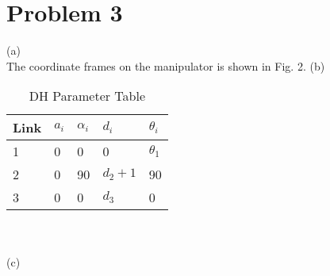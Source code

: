 \documentclass[twoside,11pt]{homework}
\begin{document}
\section*{Problem 3}
(a)\\
The coordinate frames on the manipulator is shown in Fig. 2.
(b)\\
%
\begin{table}[h!] \centering
\caption{DH Parameter Table}
\begin{tabular}{|l|l|l|l|l|}
\hline
Link & $a_i$ & \textbf{$\alpha_i$} & $d_i$   & $\theta_i$ \\ \hline
1             & 0             & 0                 & 0      & $\theta_1$ \\ \hline
2             & 0             & 90                & $d_2+1$ & 90       \\ \hline
3             & 0             & 0                 & $d_3$   & 0        \\ \hline
\end{tabular}
\end{table}
%
\\\\
(c)
\end{document}
